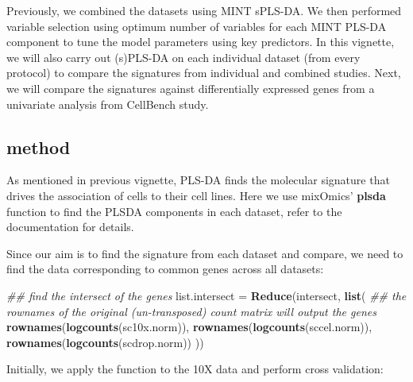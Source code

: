 \documentclass[]{book}
\newenvironment{Shaded}{\begin{snugshade}}{\end{snugshade}}
\newcommand{\CommentTok}[1]{\textcolor[rgb]{0.56,0.35,0.01}{\textit{#1}}}
\newcommand{\KeywordTok}[1]{\textcolor[rgb]{0.13,0.29,0.53}{\textbf{#1}}}
\newcommand{\NormalTok}[1]{#1}
\newcommand{\StringTok}[1]{\textcolor[rgb]{0.31,0.60,0.02}{#1}}
\theoremstyle{definition}
\theoremstyle{definition}
\theoremstyle{definition}
\theoremstyle{remark}
\begin{document}
Previously, we combined the datasets using MINT sPLS-DA. We then
performed variable selection using optimum number of variables for each
MINT PLS-DA component to tune the model parameters using key predictors.
In this vignette, we will also carry out (s)PLS-DA on each individual
dataset (from every protocol) to compare the signatures from individual
and combined studies. Next, we will compare the signatures against
differentially expressed genes from a univariate analysis from CellBench
study.

\hypertarget{method-1}{%
\subsection{method}\label{method-1}}

As mentioned in previous vignette, PLS-DA finds the molecular signature
that drives the association of cells to their cell lines. Here we use
mixOmics' \textbf{plsda} function to find the PLSDA components in each
dataset, refer to the documentation for details.

Since our aim is to find the signature from each dataset and compare, we
need to find the data corresponding to common genes across all datasets:

\begin{Shaded}
\begin{Highlighting}[]
\CommentTok{## find the intersect of the genes}
\NormalTok{list.intersect =}\StringTok{ }\KeywordTok{Reduce}\NormalTok{(intersect, }\KeywordTok{list}\NormalTok{(}
\CommentTok{## the rownames of the original (un-transposed) count matrix will output the genes}
  \KeywordTok{rownames}\NormalTok{(}\KeywordTok{logcounts}\NormalTok{(sc10x.norm)),}
  \KeywordTok{rownames}\NormalTok{(}\KeywordTok{logcounts}\NormalTok{(sccel.norm)),}
  \KeywordTok{rownames}\NormalTok{(}\KeywordTok{logcounts}\NormalTok{(scdrop.norm))}
\NormalTok{))}
\end{Highlighting}
\end{Shaded}

Initially, we apply the function to the 10X data and perform cross
validation:
\end{document}
